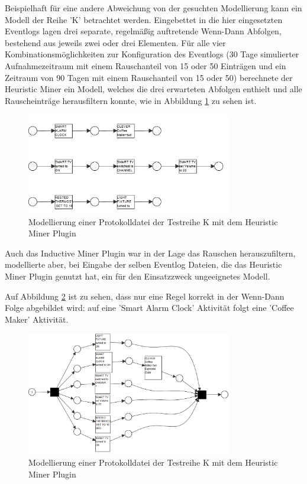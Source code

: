 Beispielhaft für eine andere Abweichung von der gesuchten Modellierung kann ein Modell der Reihe 'K' betrachtet werden. Eingebettet in die hier eingesetzten Eventlogs lagen drei separate, regelmäßig auftretende Wenn-Dann Abfolgen, bestehend aus jeweils zwei oder drei Elementen. 
Für alle vier Kombinationsmöglichkeiten zur Konfiguration des Eventlogs (30 Tage simulierter Aufnahmezeitraum mit einem Rauschanteil von 15 oder 50 Einträgen und ein Zeitraum von  90 Tagen mit einem Rauschanteil von 15 oder 50) berechnete der Heuristic Miner ein Modell, welches die drei erwarteten Abfolgen enthielt und alle Rauscheinträge herausfiltern konnte, wie in Abbildung \ref{fig:K_heuristic} zu sehen ist.
\begin{figure}[!h]
    \centering
    \includegraphics[width=0.8\textwidth,]{figures/Appbildungen/K_heuristic_correct.PNG}
    \caption{Modellierung einer Protokolldatei der Testreihe K mit dem Heuristic Miner Plugin}
    \label{fig:K_heuristic}
\end{figure}
\newpage
Auch das Inductive Miner Plugin war in der Lage das Rauschen herauszufiltern, modellierte aber, bei Eingabe der selben Eventlog Dateien, die das Heuristic Miner Plugin genutzt hat, ein für den Einsatzzweck ungeeignetes Modell. 

Auf Abbildung \ref{fig:K_inductive} ist zu sehen, dass nur eine Regel korrekt in der Wenn-Dann Folge abgebildet wird: auf eine 'Smart Alarm Clock' Aktivität folgt eine 'Coffee Maker' Aktivität. 

\begin{figure}[!h]
    \centering
    \includegraphics[width=0.8\textwidth,]{figures/Appbildungen/K_inductive_erronousPNG.PNG}
    \caption{Modellierung einer Protokolldatei der Testreihe K mit dem Heuristic Miner Plugin}
    \label{fig:K_inductive}
\end{figure}

